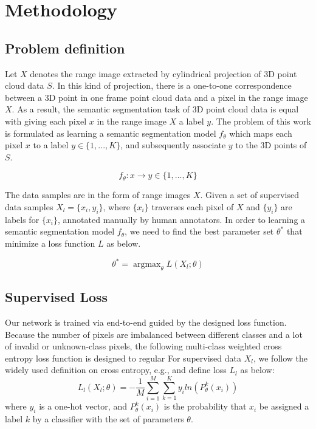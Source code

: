 \section{Methodology}
\subsection{Problem definition}

Let $X$ denotes the range image extracted by cylindrical projection of 3D point cloud data $S$. In this kind of projection, there is a one-to-one correspondence between a 3D point in one frame point cloud data and a pixel in the range image $X$. As a result, the semantic segmentation task of 3D point cloud data is equal with giving each pixel $x$ in the range image $X$ a label $y$. The problem of this work is formulated as learning a semantic segmentation model $f_{\theta}$ which maps each pixel $x$ to a label $y\in\{1,...,K\}$, and subsequently associate $y$ to the 3D points of $S$.

\begin{equation}
f_{\theta}: x\to y \in \{1,...,K\}
\end{equation}

The data samples are in the form of range images $X$. Given a set of supervised data samples $X_l=\{x_i, y_i\}$, where $\{x_i\}$ traverses each pixel of $X$ and $\{y_i\}$ are labels for $\{x_i\}$, annotated manually by human annotators. 
In order to learning a semantic segmentation model $f_\theta$, we need to find the best parameter set $\theta^*$ that minimize a loss function $L$ as below.

\begin{equation}
\theta^{*}=\mathop{\arg\max}_{\theta}L(X_l; \theta)
\end{equation}

\subsection{Supervised Loss}
Our network is trained via end-to-end guided by the designed loss function. Because the number of pixels are imbalanced between different classes and a lot of invalid or unknown-class pixels, the following multi-class weighted cross entropy loss function is designed to regular
For supervised data $X_l$, we follow the widely used definition on cross entropy, e.g.\cite{qi2017pointnet}, and define loss $L_l$ as below:
\begin{equation}
L_l(X_l;\theta)=-\frac{1}{M}\sum_{i=1}^M\sum_{k=1}^K{y_{i}ln(P^k_{\theta}(x_i))}
\end{equation}
where $y_i$ is a one-hot vector, and $P^k_{\theta}(x_i)$ is the probability that $x_i$ be assigned a label $k$ by a classifier with the set of parameters $\theta$.

